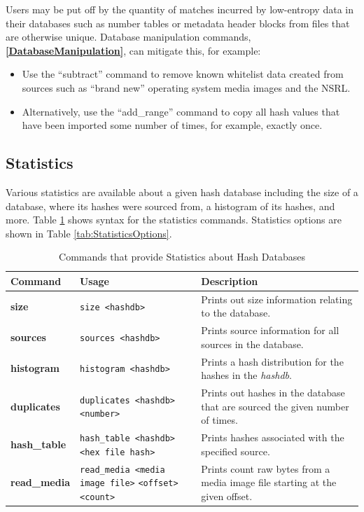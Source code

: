 \documentclass[11pt,fleqn]{article} %
\begin{document}
Users may be put off by the quantity of matches incurred by low-entropy data in their databases such as number tables or metadata header blocks from files that are otherwise unique. Database manipulation commands,
\textbf{\autoref{DatabaseManipulation}}, can mitigate this, for example:
\begin{itemize}
\item Use the ``subtract'' command to remove known whitelist data created from sources such as ``brand new'' operating system media images and the NSRL.
\item Alternatively, use the ``add\_range'' command to copy all hash values that have been imported some number of times, for example, exactly once.
\end{itemize}

\subsection{Statistics}
Various statistics are available about a given hash database including the size of a database, where its hashes were sourced from, a histogram of its hashes, and more.
Table \ref{tab:statistics} shows syntax for the statistics commands.
Statistics options are shown in Table \ref{tab:StatisticsOptions}.
\begin{table}[!ht]
\centering
\caption{Commands that provide Statistics about Hash Databases}
\label{tab:statistics}
\begin{tabular}{|p{3.5 cm}|p{6 cm}|p{4 cm}|}
\hline \hline
\textbf{Command} & \textbf{Usage} & \textbf{Description} \\
\hline
\textbf{size} & \verb+size <hashdb>+ & Prints out size information relating to the database.\\
\hline
\textbf{sources} & \verb+sources <hashdb>+ & Prints source information for all sources in the database.\\
\hline
\textbf{histogram} & \verb+histogram <hashdb>+ & Prints a hash distribution for the hashes in the \textit{hashdb}.\\
\hline
\textbf{duplicates} & \verb+duplicates <hashdb> <number>+ &  Prints out hashes in the database that are sourced the given number of times.\\
\hline
\textbf{hash\_table} & \verb+hash_table <hashdb>+ \verb+<hex file hash>+ &  Prints hashes associated with the specified source.\\
\hline
\textbf{read\_media} & \verb+read_media <media image file>+ \verb+<offset> <count>+ &  Prints count raw bytes from a media image file starting at the given offset.\\
\hline
\end{tabular}
\end{table}
\end{document}
